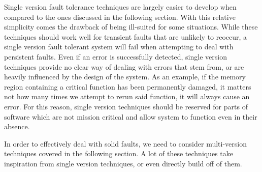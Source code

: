 Single version fault tolerance techniques are largely easier to develop when compared to the ones discussed in the following section. With this relative simplicity comes the drawback of being ill-suited for some situations. While these techniques should work well for transient faults that are unlikely to reoccur, a single version fault tolerant system will fail when attempting to deal with persistent faults. Even if an error is successfully detected, single version techniques provide no clear way of dealing with errors that stem from, or are heavily influenced by the design of the system. As an example, if the memory region containing a critical function has been permanently damaged, it matters not how many times we attempt to rerun said function, it will always cause an error. For this reason, single version techniques should be reserved for parts of software which are not mission critical and allow system to function even in their absence.

In order to effectively deal with solid faults, we need to consider multi-version techniques covered in the following section. A lot of these techniques take inspiration from single version techniques, or even directly build off of them.